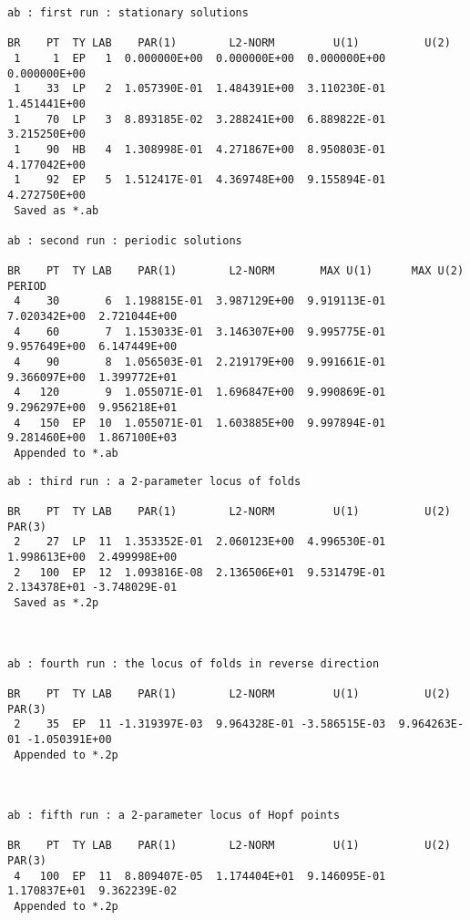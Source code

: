\newpage
\begin{center}
\begin{verbatim}
ab : first run : stationary solutions
 
BR    PT  TY LAB    PAR(1)        L2-NORM         U(1)          U(2)     
 1     1  EP   1  0.000000E+00  0.000000E+00  0.000000E+00  0.000000E+00
 1    33  LP   2  1.057390E-01  1.484391E+00  3.110230E-01  1.451441E+00
 1    70  LP   3  8.893185E-02  3.288241E+00  6.889822E-01  3.215250E+00
 1    90  HB   4  1.308998E-01  4.271867E+00  8.950803E-01  4.177042E+00
 1    92  EP   5  1.512417E-01  4.369748E+00  9.155894E-01  4.272750E+00
 Saved as *.ab

ab : second run : periodic solutions
 
BR    PT  TY LAB    PAR(1)        L2-NORM       MAX U(1)      MAX U(2)       PERIOD    
 4    30       6  1.198815E-01  3.987129E+00  9.919113E-01  7.020342E+00  2.721044E+00
 4    60       7  1.153033E-01  3.146307E+00  9.995775E-01  9.957649E+00  6.147449E+00
 4    90       8  1.056503E-01  2.219179E+00  9.991661E-01  9.366097E+00  1.399772E+01
 4   120       9  1.055071E-01  1.696847E+00  9.990869E-01  9.296297E+00  9.956218E+01
 4   150  EP  10  1.055071E-01  1.603885E+00  9.997894E-01  9.281460E+00  1.867100E+03
 Appended to *.ab
\end{verbatim}
\end{center}
\newpage 
\begin{center}
\begin{verbatim} 
ab : third run : a 2-parameter locus of folds
 
BR    PT  TY LAB    PAR(1)        L2-NORM         U(1)          U(2)        PAR(3)     
 2    27  LP  11  1.353352E-01  2.060123E+00  4.996530E-01  1.998613E+00  2.499998E+00
 2   100  EP  12  1.093816E-08  2.136506E+01  9.531479E-01  2.134378E+01 -3.748029E-01
 Saved as *.2p
 


ab : fourth run : the locus of folds in reverse direction
 
BR    PT  TY LAB    PAR(1)        L2-NORM         U(1)          U(2)        PAR(3)     
 2    35  EP  11 -1.319397E-03  9.964328E-01 -3.586515E-03  9.964263E-01 -1.050391E+00
 Appended to *.2p


 
ab : fifth run : a 2-parameter locus of Hopf points
 
BR    PT  TY LAB    PAR(1)        L2-NORM         U(1)          U(2)        PAR(3)     
 4   100  EP  11  8.809407E-05  1.174404E+01  9.146095E-01  1.170837E+01  9.362239E-02
 Appended to *.2p
\end{verbatim}
\end{center}


